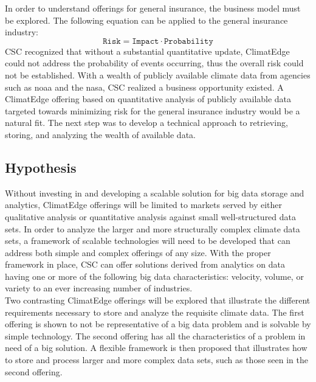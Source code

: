 In order to understand offerings for general insurance, the business model must be explored. The following equation can be applied to the general insurance industry: 
\begin{equation*}
\texttt{Risk} = \texttt{Impact} \cdot \texttt{Probability}
\end{equation*}
\textsc{CSC} recognized that without a substantial quantitative update, ClimatEdge could not address the probability of events occurring, thus the overall risk could not be established. With a wealth of publicly available climate data from agencies such as \gls{noaa} and the \gls{nasa}, \textsc{CSC} realized a business opportunity existed. A ClimatEdge offering based on quantitative analysis of publicly available data targeted towards minimizing risk for the general insurance industry would be a natural fit. The next step was to develop a technical approach to retrieving, storing, and analyzing the wealth of available data. 
\subsection{Hypothesis}
Without investing in and developing a scalable solution for big data  storage and analytics, ClimatEdge offerings will be limited to markets served by either qualitative analysis or quantitative analysis against small well-structured data sets. In order to analyze the larger and more structurally complex climate data sets, a framework of scalable technologies will need to be developed that can address both simple and complex offerings of any size. With the proper framework in place, \textsc{CSC} can offer solutions derived from analytics on data having one or more of the following big data characteristics: velocity, volume, or variety to an ever increasing number of industries.\\
 
Two contrasting ClimatEdge offerings will be explored that illustrate the different requirements necessary to store and analyze the requisite climate data. The first offering is shown to not be representative of a big data problem and is solvable by simple technology. The second offering has all the characteristics of a problem in need of a big solution. A flexible framework is then proposed that illustrates how to store and process larger and more complex data sets, such as those seen in the second offering.
